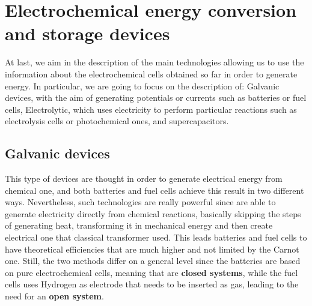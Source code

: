 \section{Electrochemical energy conversion and storage devices}

At last, we aim in the description of the main technologies allowing us to use the information about the electrochemical cells obtained so far in order to generate energy. In particular, we are going to focus on the description of: Galvanic devices, with the aim of generating potentials or currents such as batteries or fuel cells, Electrolytic, which uses electricity to perform particular reactions such as electrolysis cells or photochemical ones, and supercapacitors.

\subsection{Galvanic devices}

This type of devices are thought in order to generate electrical energy from chemical one, and both batteries and fuel cells achieve this result in two different ways. Nevertheless, such technologies are really powerful since are able to generate electricity directly from chemical reactions, basically skipping the steps of generating heat, transforming it in mechanical energy and then create electrical one that classical transformer used. This leads batteries and fuel cells to have theoretical efficiencies that are much higher and not limited by the Carnot one. Still, the two methods differ on a general level since the batteries are based on pure electrochemical cells, meaning that are \textbf{closed systems}, while the fuel cells uses Hydrogen as electrode that needs to be inserted as gas, leading to the need for an \textbf{open system}.

